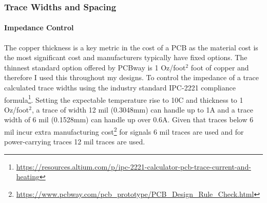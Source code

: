 \begin{comment}
    

\subsubsection{Component Placement}\label{sub_sub_section:tgt_component_placement}

\paragraph{Thermal Considerations}
Heat dissipating elements, typically diodes and resistors, can cause damage to electronic component, therefore, heat sinks or controlled airflows are sometimes required. This consideration is why on my devices Buck Converters of above 90\% are used instead of the less efficient \gls{LDO} which would have an efficiency of 66\% when converting from 5V to 3.3V. This, in addition to the low power draws of all other components, means that no explicit thermal management is needed.
\end{comment}

\subsubsection{Trace Widths and Spacing}\label{sub_sub_section:tgt_trace_width}
\paragraph{Impedance Control}
The copper thickness is a key metric in the cost of a \gls{PCB} as the material cost is the most significant cost and manufacturers typically have fixed options. The thinnest standard option offered by PCBway is 1 Oz/foot$^2$ foot of copper and therefore I used this throughout my designs. To control the impedance of a trace calculated trace widths using the industry standard IPC-2221 compliance formula\footnote{\url{https://resources.altium.com/p/ipc-2221-calculator-pcb-trace-current-and-heating}}. Setting the expectable temperature rise to 10\degree C and thickness to 1 Oz/foot$^2$, a trace of width 12 mil (0.3048mm) can handle up to 1A and a trace width of 6 mil (0.1528mm) can handle up over 0.6A. Given that traces below 6 mil incur extra manufacturing cost\footnote{\url{https://www.pcbway.com/pcb_prototype/PCB_Design_Rule_Check.html}} for signals 6 mil traces are used and for power-carrying traces 12 mil traces are used.
